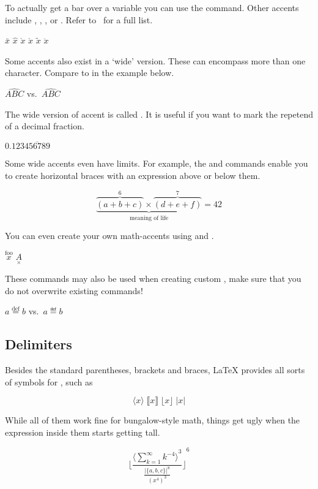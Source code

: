 To actually get a bar over a variable you can use the  command. Other
accents include , ,
,  or . Refer to~\cite{unicode-math-symbols}
for a full list.
\begin{example}
\(\bar{x}\) \(\hat{x}\)
\(\grave{x}\) \(\acute{x}\)
\(\tilde{x}\) \(\ddot{x}\)
\end{example}

Some accents also exist in a \enquote*{wide} version. These can encompass more
than one character. Compare  to  in the example below.
\begin{example}
\(\hat{ABC}\) vs.\
\(\widehat{ABC}\)
\end{example}
The wide version of  accent is called . It is useful if
you want to mark the repetend of a decimal fraction.
\begin{example}
\(0.123\overline{456789}\)
\end{example}

Some wide accents even have limits. For example, the  and
\csi{underbrace} commands enable you to create horizontal braces with an
expression above or below them.
\begin{example}
\[
  \underbrace{
    \overbrace{(a+b+c)}^6 
    \times
    \overbrace{(d+e+f)}^7
  }_{\text{meaning of life}}=42
\]
\end{example}

You can even create your own math-accents using
 and .
\begin{example}
\(\overset{\text{foo}}{x}\)
\(\underset{\times}{A}\)
\end{example}
These commands may also be used when creating custom ,
make sure that you do not overwrite existing commands!
\begin{example}
\(a \overset{\text{def}}{=} b\)
vs.\ \(a \eqdef b\)
\end{example}

\subsection{Delimiters}\label{sec:delimiters}

Besides the standard parentheses, brackets and braces, \LaTeX{} provides all
sorts of symbols for \wi{delimiters}, such as
\begin{example}
\[
  \langle x \rangle
  \; %
  \lBrack x \rBrack 
  \; %
  \lfloor x \rfloor
  \; %
  \lvert x \rvert
\]
\end{example}
While all of them work fine for bungalow-style math, things get ugly when the
expression inside them starts getting tall.
\begin{example}[vertical_mode, examplewidth=0.8\linewidth]
\[
  {\lfloor
    \frac
    {{\langle\sum_{k=1}^{\infty} k^{-4}\rangle}^3}
    {\frac{{\lvert\{a,b,c\}\rvert}^8}{{(x^4)}^3}}
  \rfloor}^6
\]
\end{example}

